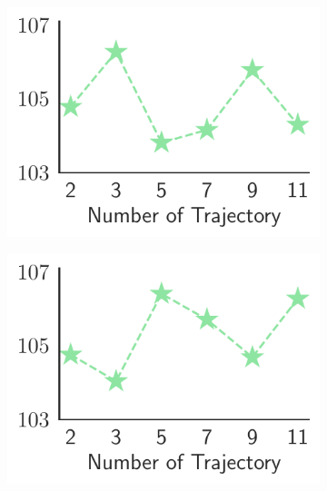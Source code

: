 \begin{figure}[tb]
     \centering
     \begin{subfigure}[b]{0.24\textwidth}
         \centering
         \includegraphics[width=\textwidth]{./Tex/fig/ListNet_p=1_line.pdf}
         \captionsetup{font=small}
         \vspace{-6mm}
         \caption{\rewardnet}
         \label{fig:listnet_p1_num_traj}
     \end{subfigure}
     \hfill
     \begin{subfigure}[b]{0.24\textwidth}
         \centering
         \includegraphics[width=\textwidth]{./Tex/fig/listMLE_softmax_line.pdf}
         \captionsetup{font=small}

\end{subfigure}
\end{figure}
